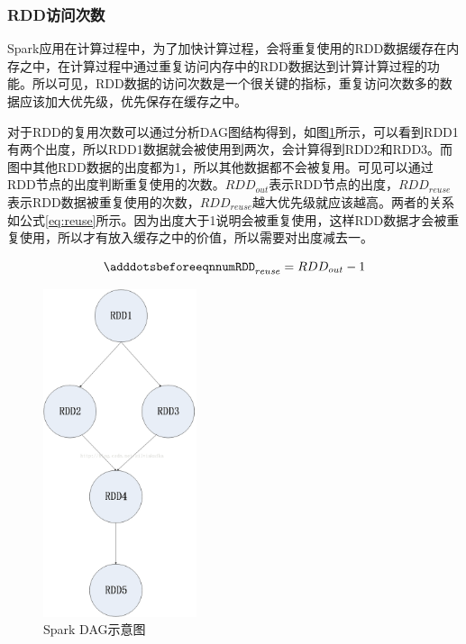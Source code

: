 \subsubsection{RDD访问次数}

Spark应用在计算过程中，为了加快计算过程，会将重复使用的RDD数据缓存在内存之中，在计算过程中通过重复访问内存中的RDD数据达到计算计算过程的功能。所以可见，RDD数据的访问次数是一个很关键的指标，重复访问次数多的数据应该加大优先级，优先保存在缓存之中。

对于RDD的复用次数可以通过分析DAG图结构得到，如图\ref{fig:spark-dag}所示，可以看到RDD1有两个出度，所以RDD1数据就会被使用到两次，会计算得到RDD2和RDD3。而图中其他RDD数据的出度都为1，所以其他数据都不会被复用。可见可以通过RDD节点的出度判断重复使用的次数。$RDD_{out}$表示RDD节点的出度，$RDD_{reuse}$表示RDD数据被重复使用的次数，$RDD_{reuse}$越大优先级就应该越高。两者的关系如公式\eqref{eq:reuse}所示。因为出度大于1说明会被重复使用，这样RDD数据才会被重复使用，所以才有放入缓存之中的价值，所以需要对出度减去一。

\begin{equation} \label{eq:reuse}
    \adddotsbeforeeqnnum%
    RDD_{reuse} = RDD_{out} - 1
\end{equation}

\begin{figure}[htbp]
    \centering
    \includegraphics[width=0.4\textwidth]{Img/spark-dag.png}
    \caption{Spark DAG示意图}
    \label{fig:spark-dag}
\end{figure}


